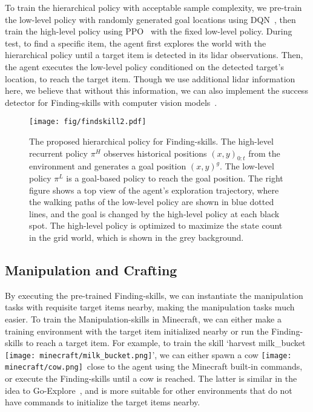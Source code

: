 \documentclass{article}
\newcommand{\mccow}{\texttt{[image: minecraft/cow.png]}}
\newcommand{\mclog}{\texttt{[image: minecraft/log.png]}}
\newcommand{\mcmilkbucket}{\texttt{[image: minecraft/milk\_bucket.png]}}
\begin{document}
To train the hierarchical policy with acceptable sample complexity, we pre-train the low-level policy with randomly generated goal locations using DQN~\citep{dqn}, then train the high-level policy using PPO~\citep{ppo} with the fixed low-level policy. During test, to find a specific item, the agent first explores the world with the hierarchical policy until a target item is detected in its lidar observations. Then, the agent executes the low-level policy conditioned on the detected target's location, to reach the target item. Though we use additional lidar information here, we believe that without this information, we can also implement the success detector for Finding-skills with computer vision models~\citep{vlm-detectors}.

\begin{figure}[!t]
  \centering
  \texttt{[image: fig/findskill2.pdf]}
  \caption{The proposed hierarchical policy for Finding-skills. The high-level recurrent policy $\pi^H$ observes historical positions $(x,y)_{0:t}$ from the environment and generates a goal position $(x,y)^g$. The low-level policy $\pi^L$ is a goal-based policy to reach the goal position. The right figure shows a top view of the agent's exploration trajectory, where the walking paths of the low-level policy are shown in blue dotted lines, and the goal is changed by the high-level policy at each black spot. The high-level policy is optimized to maximize the state count in the grid world, which is shown in the grey background.}
  \label{fig:findskill}
\end{figure}

\subsection{Manipulation and Crafting}
\label{subsec:manipulation-skills}
By executing the pre-trained Finding-skills, we can instantiate the manipulation tasks with requisite target items nearby, making the manipulation tasks much easier.
To train the Manipulation-skills in Minecraft, we can either make a training environment with the target item initialized nearby or run the Finding-skills to reach a target item.
For example, to train the skill `harvest milk\_bucket \mcmilkbucket', we can either spawn a cow \mccow \ close to the agent using the Minecraft built-in commands, or execute the Finding-skills until a cow is reached. %
The latter is similar in the idea to Go-Explore~\citep{go-explore}, and is more suitable for other environments that do not have commands to initialize the target items nearby.
\end{document}
